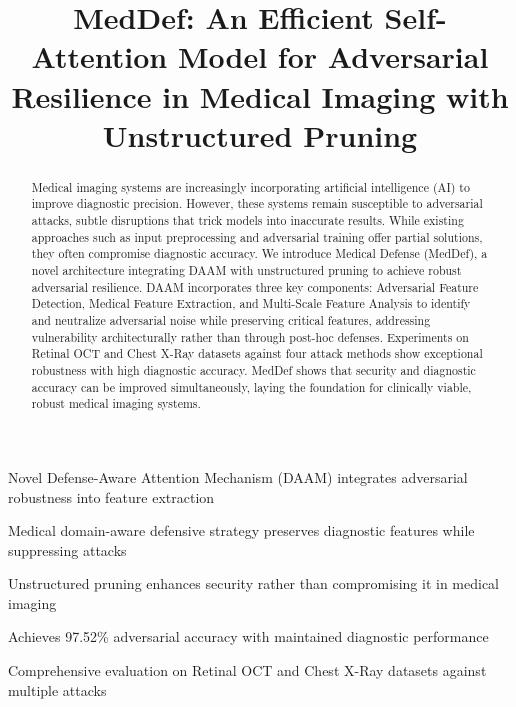 \documentclass[preprint,12pt]{elsarticle}
\begin{document}
\begin{frontmatter}



\title{MedDef: An Efficient Self-Attention Model for Adversarial Resilience in Medical Imaging with Unstructured Pruning}


\begin{abstract}
Medical imaging systems are increasingly incorporating artificial intelligence (AI) to improve diagnostic precision. However, these systems remain susceptible to adversarial attacks, subtle disruptions that trick models into inaccurate results. While existing approaches such as input preprocessing and adversarial training offer partial solutions, they often compromise diagnostic accuracy. We introduce Medical Defense (MedDef), a novel architecture integrating DAAM with unstructured pruning to achieve robust adversarial resilience. DAAM incorporates three key components: Adversarial Feature Detection, Medical Feature Extraction, and Multi-Scale Feature Analysis to identify and neutralize adversarial noise while preserving critical features, addressing vulnerability architecturally rather than through post-hoc defenses. Experiments on Retinal OCT and Chest X-Ray datasets against four attack methods show exceptional robustness with high diagnostic accuracy. MedDef shows that security and diagnostic accuracy can be improved simultaneously, laying the foundation for clinically viable, robust medical imaging systems.
\end{abstract}

\begin{highlights}
\item Novel Defense-Aware Attention Mechanism (DAAM) integrates adversarial robustness into feature extraction
\item Medical domain-aware defensive strategy preserves diagnostic features while suppressing attacks
\item Unstructured pruning enhances security rather than compromising it in medical imaging
\item Achieves 97.52\% adversarial accuracy with maintained diagnostic performance
\item Comprehensive evaluation on Retinal OCT and Chest X-Ray datasets against multiple attacks
\end{highlights}


\end{frontmatter}
\end{document}
